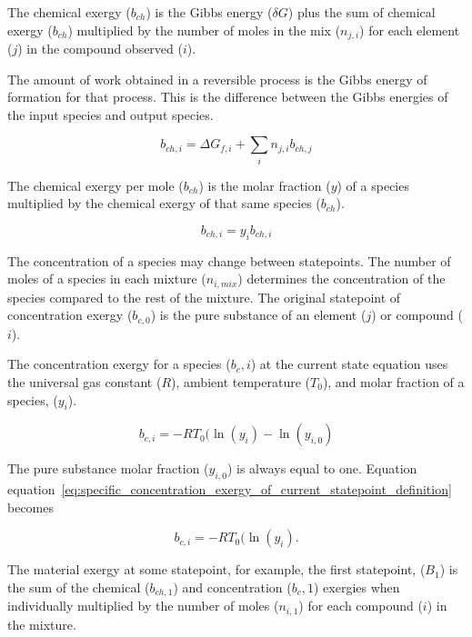 \documentclass[energies,article,submit,pdftex,moreauthors]{Definitions/mdpi}
\begin{document}
The chemical exergy ($b_{ch}$) is the Gibbs energy ($\delta{G}$)
plus the sum of chemical exergy ($b_{ch}$)
multiplied by the number of moles
in the mix ($n_{j,i}$) for each element ($j$)
in the compound observed ($i$).

The amount of work obtained
in a reversible process is the Gibbs energy
of formation for that process.
This is the difference between the Gibbs energies
of the input species and output species.

\begin{equation}\label{eq:specific_chemical_exergy_definition}
  b_{ch,i} = \Delta{G_{f,i}} + \sum_{i}{n_{j,i}b_{ch,j}}
\end{equation}

The chemical exergy per mole ($b_{ch}$) is the molar fraction ($y$)
of a species multiplied by the chemical exergy of that same species ($b_{ch}$).

\begin{equation}\label{eq:chemical_exergy_state_point1}
  b_{ch,i} = y_{i}b_{ch,i}
\end{equation}

The concentration of a species
may change between statepoints.
The number of moles of a species in each mixture ($n_{i,mix}$)
determines the concentration of the species
compared to the rest of the mixture.
The original statepoint of concentration exergy ($b_{c,0}$) is the pure substance
of an element ($j$) or compound ($i$).

The concentration exergy for a species ($b_c,i$)
at the current state
equation uses the universal gas constant ($R$),
ambient temperature ($T_0$),
and molar fraction of a species, ($y_i$).

\begin{equation}\label{eq:specific_concentration_exergy_of_current_statepoint_definition}
  b_{c,i} = -RT_{0}(\ln(y_{i}) - \ln(y_{i,0})
\end{equation}

The pure substance molar fraction ($y_{i,0}$) is always equal to one.
Equation equation~\ref{eq:specific_concentration_exergy_of_current_statepoint_definition} becomes

\begin{equation}\label{eq:specific_concentration_exergy_of_current_statepoint_definition}
  b_{c,i} = -RT_{0}(\ln(y_{i}).
\end{equation}


The material exergy at some statepoint, for example, the first statepoint, ($B_{1}$)
is the sum of the chemical ($b_{ch,1}$) and concentration ($b_c,1$) exergies
when individually multiplied
by the number of moles ($n_{i,1}$)
for each compound ($i$) in the mixture.
\end{document}
